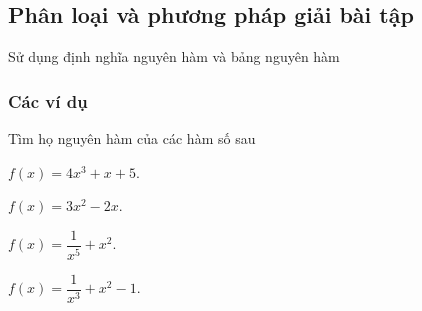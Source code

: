 \subsection{Phân loại và phương pháp giải bài tập}
\begin{dang}{Sử dụng định nghĩa nguyên hàm và bảng nguyên hàm}
\end{dang}
\subsubsection{Các ví dụ}
\begin{vd}%
	Tìm họ nguyên hàm của các hàm số sau
    \begin{listEX}[2]
        \item $f(x)=4x^3+x+5$.
        \item $f(x)=3x^2-2x$.
        \item $f(x)=\dfrac{1}{x^5}+x^2$.
        \item $f(x)=\dfrac{1}{x^3}+x^2-1$.
    \end{listEX}
    \end{vd}

